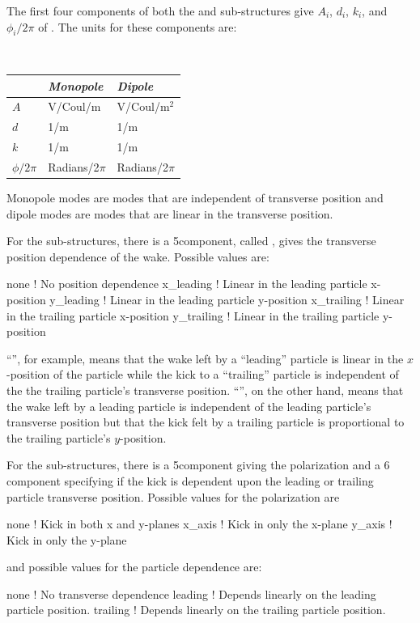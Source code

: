 The first four components of both the  and  sub-structures give
$A_i$, $d_i$, $k_i$, and $\phi_i/2\pi$ of . The units for these components are:
\begin{center} \tt
\begin{tabular}{lll} \toprule
                & {\em Monopole}  & {\em Dipole}     \\ \midrule
  $A$           & V/Coul/m        & V/Coul/m$^2$     \\
  $d$           & 1/m             & 1/m              \\
  $k$           & 1/m             & 1/m              \\
  $\phi/2\pi$   & Radians/2$\pi$  & Radians/2$\pi$   \\ \bottomrule
\end{tabular}
\end{center}
Monopole modes are modes that are independent of transverse position and dipole modes are modes that
are linear in the transverse position. 

For the  sub-structures, there is a 5\Th component, called
, gives the transverse position dependence of the wake. Possible values are:
\begin{example}
  none          ! No position dependence
  x_leading     ! Linear in the leading particle x-position
  y_leading     ! Linear in the leading particle y-position
  x_trailing    ! Linear in the trailing particle x-position
  y_trailing    ! Linear in the trailing particle y-position
\end{example}
``'', for example, means that the wake left by a ``leading'' particle is linear
in the $x$-position of the particle while the kick to a ``trailing'' particle is independent of the
the trailing particle's transverse position. ``'', on the other hand, means that the 
wake left by a leading particle is independent of the leading particle's transverse position but that
the kick felt by a trailing particle is proportional to the trailing particle's $y$-position.

For the  sub-structures, there is a 5\Th component giving the polarization and a 6\Th
component specifying if the kick is dependent upon the leading or trailing particle transverse position.
Possible values for the polarization are
\begin{example}
  none          ! Kick in both x and y-planes
  x_axis        ! Kick in only the x-plane
  y_axis        ! Kick in only the y-plane
\end{example}
and possible values for the particle dependence are:
\begin{example}
  none          ! No transverse dependence
  leading       ! Depends linearly on the leading particle position.
  trailing      ! Depends linearly on the trailing particle position.
\end{example}

